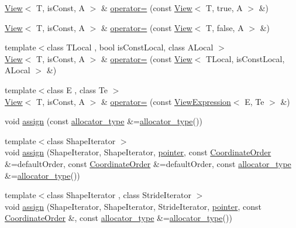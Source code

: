 \begin{DoxyCompactItemize}
\item 
\hyperlink{classandres_1_1View}{View}$<$ T, is\+Const, A $>$ \& \hyperlink{classandres_1_1View_a604e4fe802e5d712a4e99ae44e496a3f}{operator=} (const \hyperlink{classandres_1_1View}{View}$<$ T, true, A $>$ \&)
\item 
\hyperlink{classandres_1_1View}{View}$<$ T, is\+Const, A $>$ \& \hyperlink{classandres_1_1View_a24aacc568e0bd3a5c69fe1d9550d03f7}{operator=} (const \hyperlink{classandres_1_1View}{View}$<$ T, false, A $>$ \&)
\item 
{\footnotesize template$<$class T\+Local , bool is\+Const\+Local, class A\+Local $>$ }\\\hyperlink{classandres_1_1View}{View}$<$ T, is\+Const, A $>$ \& \hyperlink{classandres_1_1View_a56d4233c4be9807ff750039ade3ae4d3}{operator=} (const \hyperlink{classandres_1_1View}{View}$<$ T\+Local, is\+Const\+Local, A\+Local $>$ \&)
\item 
{\footnotesize template$<$class E , class Te $>$ }\\\hyperlink{classandres_1_1View}{View}$<$ T, is\+Const, A $>$ \& \hyperlink{classandres_1_1View_a719e584cdfc9bbf38417dadb8362610e}{operator=} (const \hyperlink{classandres_1_1ViewExpression}{View\+Expression}$<$ E, Te $>$ \&)
\item 
void \hyperlink{classandres_1_1View_adb82f950ac02e2482376914be5c5595c}{assign} (const \hyperlink{classandres_1_1View_a175e5862a7133a937e7901e5894c2e10}{allocator\+\_\+type} \&=\hyperlink{classandres_1_1View_a175e5862a7133a937e7901e5894c2e10}{allocator\+\_\+type}())
\item 
{\footnotesize template$<$class Shape\+Iterator $>$ }\\void \hyperlink{classandres_1_1View_ab227fd41b348249cbc149b5cff2cee49}{assign} (Shape\+Iterator, Shape\+Iterator, \hyperlink{classandres_1_1View_a9a201594c82be89fccd0fe644ea2f09c}{pointer}, const \hyperlink{namespaceandres_a2ac8b7aa89d44e8188a7c0ba50f4306b}{Coordinate\+Order} \&=default\+Order, const \hyperlink{namespaceandres_a2ac8b7aa89d44e8188a7c0ba50f4306b}{Coordinate\+Order} \&=default\+Order, const \hyperlink{classandres_1_1View_a175e5862a7133a937e7901e5894c2e10}{allocator\+\_\+type} \&=\hyperlink{classandres_1_1View_a175e5862a7133a937e7901e5894c2e10}{allocator\+\_\+type}())
\item 
{\footnotesize template$<$class Shape\+Iterator , class Stride\+Iterator $>$ }\\void \hyperlink{classandres_1_1View_a0bee9a9e389a0d9af1c8cc4bbe85aeb7}{assign} (Shape\+Iterator, Shape\+Iterator, Stride\+Iterator, \hyperlink{classandres_1_1View_a9a201594c82be89fccd0fe644ea2f09c}{pointer}, const \hyperlink{namespaceandres_a2ac8b7aa89d44e8188a7c0ba50f4306b}{Coordinate\+Order} \&, const \hyperlink{classandres_1_1View_a175e5862a7133a937e7901e5894c2e10}{allocator\+\_\+type} \&=\hyperlink{classandres_1_1View_a175e5862a7133a937e7901e5894c2e10}{allocator\+\_\+type}())

\end{DoxyCompactItemize}
